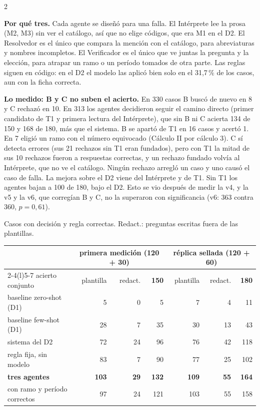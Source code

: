 \documentclass[9pt,a4paper]{extarticle}
\newcommand{\seccion}[1]{\vspace{0.6mm}{\bfseries\footnotesize\color{acento}\MakeUppercase{#1}}\par\nobreak\vspace{0.4mm}\nobreak}
\newcommand{\q}{\textquotedbl}
\begin{document}
\begin{multicols}{2}
\vspace{0.6mm}
{\footnotesize
\textbf{Por qué tres.} Cada agente se diseñó para una falla. El Intérprete lee la prosa (M2, M3) sin
ver el catálogo, así que no elige códigos, que era M1 en el D2. El Resolvedor es el
único que compara la mención con el catálogo, para abreviaturas y nombres incompletos. El
Verificador es el único que ve juntas la pregunta y la elección, para atrapar un ramo o un
período tomados de otra parte. Las reglas siguen en código: en el D2 el modelo las aplicó
bien solo en el 31,7\,\% de los casos, aun con la ficha correcta.

\textbf{Lo medido: B y C no suben el acierto.} En 330 casos B buscó de nuevo en 8 y C
rechazó en 10. En 313 los agentes decidieron seguir el camino directo (primer candidato de T1
y primera lectura del Intérprete), que sin B ni C acierta 134 de 150 y 168 de 180, más que el
sistema. B se apartó de T1 en 16 casos y acertó 1. En 7 eligió un ramo con el número
equivocado (Cálculo II por \q cálculo 3\q). C sí detecta errores (sus 21 rechazos sin T1 eran
fundados), pero con T1 la mitad de sus 10 rechazos fueron a respuestas correctas, y un rechazo
fundado volvía al Intérprete, que no ve el catálogo. Ningún rechazo arregló un caso y uno causó
el caso de falla. La mejora sobre el D2 viene del Intérprete y de T1. Sin T1 los agentes bajan
a 100 de 180, bajo el D2. Esto se vio después de medir la v4, y la v5 y la v6, que corregían B
y C, no la superaron con significancia (v6: 363 contra 360, $p=0{,}61$).\par}

\columnbreak

\seccion{Resultados}

{\footnotesize Casos con decisión y regla correctas. Redact.: preguntas escritas fuera de las plantillas.\\
\begin{tabular}{@{}lrrrrrr@{}}
\toprule
& \multicolumn{3}{c}{primera medición (120 + 30)} & \multicolumn{3}{c}{réplica sellada (120 + 60)} \\
\cmidrule(lr){2-4}\cmidrule(l){5-7}
acierto conjunto & plantilla & redact. & \textbf{150} & plantilla & redact. & \textbf{180} \\
\midrule
baseline zero-shot (D1)  &   5 &  0 &   5 &   7 &  4 &  11 \\
baseline few-shot (D1)   &  28 &  7 &  35 &  30 & 13 &  43 \\
sistema del D2           &  72 & 24 &  96 &  76 & 42 & 118 \\
regla fija, sin modelo   &  83 &  7 &  90 &  77 & 25 & 102 \\
\rowcolor{fondo}
\textbf{tres agentes}    & \textbf{103} & \textbf{29} & \textbf{132} & \textbf{109} & \textbf{55} & \textbf{164} \\
\quad con ramo y período correctos & 97 & 24 & 121 & 103 & 55 & 158 \\
\bottomrule
\end{tabular}\par}


\end{multicols}
\end{document}

